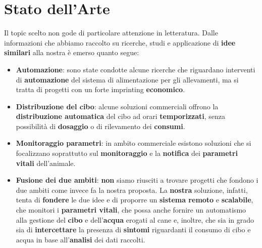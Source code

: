 

\chapter{Stato dell'Arte}
Il topic scelto non gode di particolare attenzione in letteratura.
Dalle informazioni che abbiamo raccolto su ricerche, studi e applicazione di \textbf{idee similari} alla nostra è emerso quanto segue:

\begin{itemize}
    \item \textbf{Automazione}: sono state condotte alcune ricerche che riguardano interventi di \textbf{automazione} del sistema di alimentazione per gli allevamenti, ma si tratta di progetti con un forte imprinting \textbf{economico}. 
    \item \textbf{Distribuzione del cibo}: alcune soluzioni commerciali offrono la \textbf{distribuzione automatica }del cibo ad orari \textbf{temporizzati}, senza possibilità di \textbf{dosaggio} o di rilevamento dei \textbf{consumi}.
    \item \textbf{Monitoraggio parametri}: in ambito commerciale esistono soluzioni che si focalizzano soprattutto sul \textbf{monitoraggio} e la \textbf{notifica} dei \textbf{parametri vitali} dell'animale.
    \item \textbf{Fusione dei due ambiti}: \textbf{non} siamo riusciti a trovare progetti che fondono i due ambiti come invece fa la nostra proposta. La \textbf{nostra} soluzione, infatti, tenta di \textbf{fondere} le due idee e di proporre un \textbf{sistema remoto} e \textbf{scalabile}, che monitori i \textbf{parametri vitali}, che possa anche fornire un automatismo alla gestione del \textbf{cibo} e dell'\textbf{acqua} erogati al cane e, inoltre, che sia in grado sia di \textbf{intercettare} la presenza di \textbf{sintomi} riguardanti il consumo di cibo e acqua in base all'\textbf{analisi} dei dati raccolti.
\end{itemize}
 



